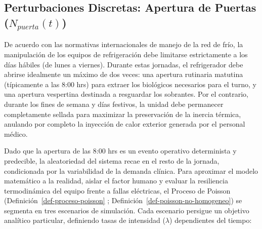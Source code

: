 \documentclass[
  spanish,
  us-letterpaper,
]{scrreprt}
\numberwithin{equation}{section}
\theoremstyle{plain}
\theoremstyle{plain}
\theoremstyle{definition}
\theoremstyle{plain}
\theoremstyle{remark}
\begin{document}
\subsection{\texorpdfstring{Perturbaciones Discretas: Apertura de
Puertas
(\(N_{puerta}(t)\))}{Perturbaciones Discretas: Apertura de Puertas (N\_\{puerta\}(t))}}\label{sec-perturbaciones-discretas}

De acuerdo con las normativas internacionales de manejo de la red de
frío, la manipulación de los equipos de refrigeración debe limitarse
estrictamente a los días hábiles (de lunes a viernes). Durante estas
jornadas, el refrigerador debe abrirse idealmente un máximo de dos
veces: una apertura rutinaria matutina (típicamente a las 8:00 hrs) para
extraer los biológicos necesarios para el turno, y una apertura
vespertina destinada a resguardar los sobrantes. Por el contrario,
durante los fines de semana y días festivos, la unidad debe permanecer
completamente sellada para maximizar la preservación de la inercia
térmica, anulando por completo la inyección de calor exterior generada
por el personal médico.

Dado que la apertura de las 8:00 hrs es un evento operativo determinista
y predecible, la aleatoriedad del sistema recae en el resto de la
jornada, condicionada por la variabilidad de la demanda clínica. Para
aproximar el modelo matemático a la realidad, aislar el factor humano y
evaluar la resiliencia termodinámica del equipo frente a fallas
eléctricas, el Proceso de Poisson (Definición~\ref{def-proceso-poisson}
; Definición~\ref{def-poisson-no-homogeneo}) se segmenta en tres
escenarios de simulación. Cada escenario persigue un objetivo analítico
particular, definiendo tasas de intensidad (\(\lambda\)) dependientes
del tiempo:
\end{document}
